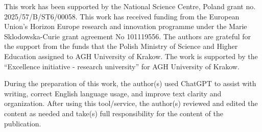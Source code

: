 \documentclass[review]{elsarticle}
\begin{document}
 This work has been supported by the National Science Centre, Poland grant no. 
2025/57/B/ST6/00058. 
This work has received funding from the European Union's Horizon Europe research and innovation programme under the Marie Sklodowska-Curie grant agreement No 101119556.
The authors are grateful for the support from the funds that the Polish Ministry of Science and Higher Education assigned to AGH University of Krakow. The work is supported by the “Excellence initiative - research university” for AGH University of Krakow.

During the preparation of this work, the author(s) used ChatGPT to assist with writing, correct English language usage, and improve text clarity and organization. After using this tool/service, the author(s) reviewed and edited the content as needed and take(s) full responsibility for the content of the publication.
\end{document}
